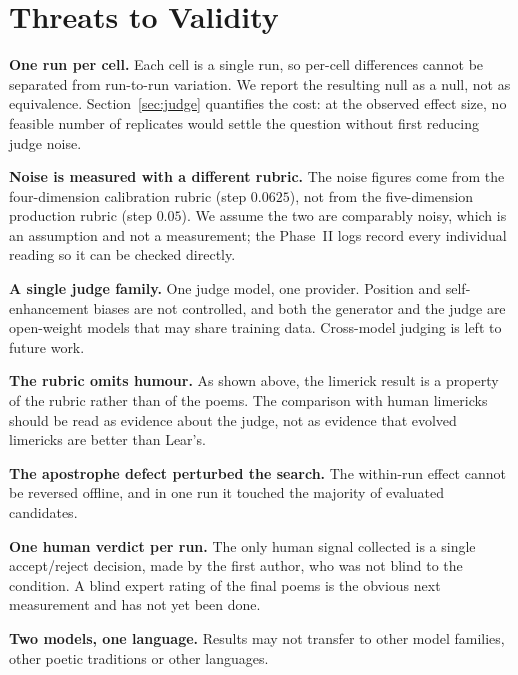 \documentclass[conference]{IEEEtran}
\begin{document}
\section{Threats to Validity}\label{sec:threats}
\textbf{One run per cell.} Each cell is a single run, so per-cell differences
cannot be separated from run-to-run variation. We report the resulting null as a
null, not as equivalence. Section~\ref{sec:judge} quantifies the cost: at the
observed effect size, no feasible number of replicates would settle the question
without first reducing judge noise.

\textbf{Noise is measured with a different rubric.} The noise figures come from
the four-dimension calibration rubric (step $0.0625$), not from the
five-dimension production rubric (step $0.05$). We assume the two are comparably
noisy, which is an assumption and not a measurement; the Phase~II logs record
every individual reading so it can be checked directly.

\textbf{A single judge family.} One judge model, one provider. Position and
self-enhancement biases \cite{zheng2023,wang2024fair} are not controlled, and
both the generator and the judge are open-weight models that may share training
data. Cross-model judging is left to future work.

\textbf{The rubric omits humour.} As shown above, the limerick result is a
property of the rubric rather than of the poems. The comparison with human
limericks should be read as evidence about the judge, not as evidence that
evolved limericks are better than Lear's.

\textbf{The apostrophe defect perturbed the search.} The within-run effect cannot
be reversed offline, and in one run it touched the majority of evaluated
candidates.

\textbf{One human verdict per run.} The only human signal collected is a single
accept/reject decision, made by the first author, who was not blind to the
condition. A blind expert rating of the final poems is the obvious next
measurement and has not yet been done.

\textbf{Two models, one language.} Results may not transfer to other model
families, other poetic traditions or other languages.

\end{document}
